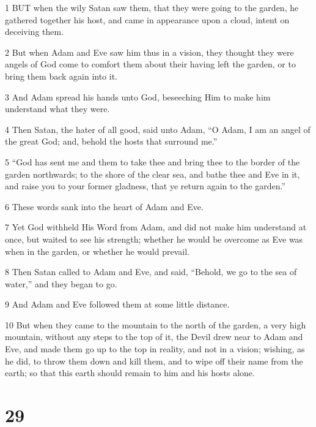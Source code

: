 \par 1 BUT when the wily Satan saw them, that they were going to the garden, he gathered together his host, and came in appearance upon a cloud, intent on deceiving them.

\par 2 But when Adam and Eve saw him thus in a vision, they thought they were angels of God come to comfort them about their having left the garden, or to bring them back again into it.

\par 3 And Adam spread his hands unto God, beseeching Him to make him understand what they were.

\par 4 Then Satan, the hater of all good, said unto Adam, “O Adam, I am an angel of the great God; and, behold the hosts that surround me.”

\par 5 “God has sent me and them to take thee and bring thee to the border of the garden northwards; to the shore of the clear sea, and bathe thee and Eve in it, and raise you to your former gladness, that ye return again to the garden.”

\par 6 These words sank into the heart of Adam and Eve.

\par 7 Yet God withheld His Word from Adam, and did not make him understand at once, but waited to see his strength; whether he would be overcome as Eve was when in the garden, or whether he would prevail.

\par 8 Then Satan called to Adam and Eve, and said, “Behold, we go to the sea of water,” and they began to go.

\par 9 And Adam and Eve followed them at some little distance.

\par 10 But when they came to the mountain to the north of the garden, a very high mountain, without any steps to the top of it, the Devil drew near to Adam and Eve, and made them go up to the top in reality, and not in a vision; wishing, as he did, to throw them down and kill them, and to wipe off their name from the earth; so that this earth should remain to him and his hosts alone.



\chapter{29}


